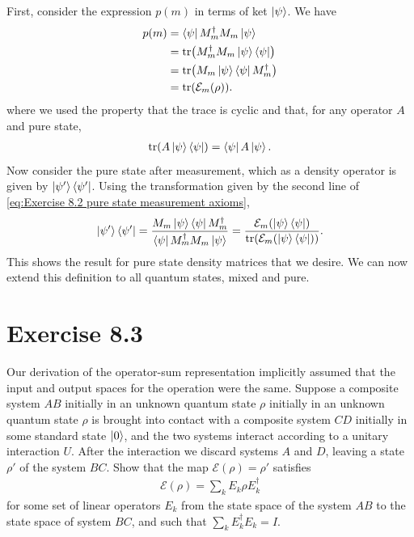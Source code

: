 \documentclass{book}
\newcommand{\mc}[1]{\mathcal{#1}}
\begin{document}
    First, consider the expression $p(m)$ in terms of ket $\ket{\psi}$. We have
    \begin{align}
    \begin{aligned}
        p(m) &= \bra{\psi}M_m^\dagger M_m \ket{\psi} \\
        &= \tr (M_m^\dagger M_m \ket{\psi}\bra{\psi}) \\
        &= \tr (M_m\ket{\psi}\bra{\psi}M_m^\dagger) \\
        &= \tr(\mc{E}_m(\rho)).
    \end{aligned}
    \end{align}
    where we used the property that the trace is cyclic and that, for any operator $A$ and pure state,
    \begin{align}
        \tr( A \ket{\psi}\bra{\psi}) = \bra{\psi}A\ket{\psi}.
    \end{align}
    Now consider the pure state after measurement, which as a density operator is given by $\ket{\psi'}\bra{\psi'}$. Using the transformation given by the second line of \eqref{eq:Exercise 8.2 pure state measurement axioms},
    \begin{align}
        \ket{\psi'}\bra{\psi'} = \frac{M_m\ket{\psi}\bra{\psi}M_m^\dagger}{\bra{\psi} M_m^\dagger M_m\ket{\psi}} = \frac{\mc{E}_m(\ket{\psi}\bra{\psi})}{\tr(\mc{E}_m(\ket{\psi}\bra{\psi}))}.
    \end{align}
    This shows the result for pure state density matrices that we desire. We can now extend this definition to all quantum states, mixed and pure. 
    
\section*{Exercise 8.3}
    Our derivation of the operator-sum representation implicitly assumed that the input and output spaces for the operation were the same. Suppose a composite system $AB$ initially in an unknown quantum state $\rho$ initially in an unknown quantum state $\rho$ is brought into contact with a composite system $CD$ initially in some standard state $\ket{0}$, and the two systems interact according to a unitary interaction $U$. After the interaction we discard systems $A$ and $D$, leaving a state $\rho'$ of the system $BC$. Show that the map $\mc{E}(\rho) = \rho'$ satisfies
    \begin{align}
        \mc{E}(\rho) = \sum_k E_k \rho E_k^\dagger
    \end{align}
    for some set of linear operators $E_k$ from the state space of the system $AB$ to the state space of system $BC$, and such that $\sum_k E_k^\dagger E_k = I$.
    
\end{document}
